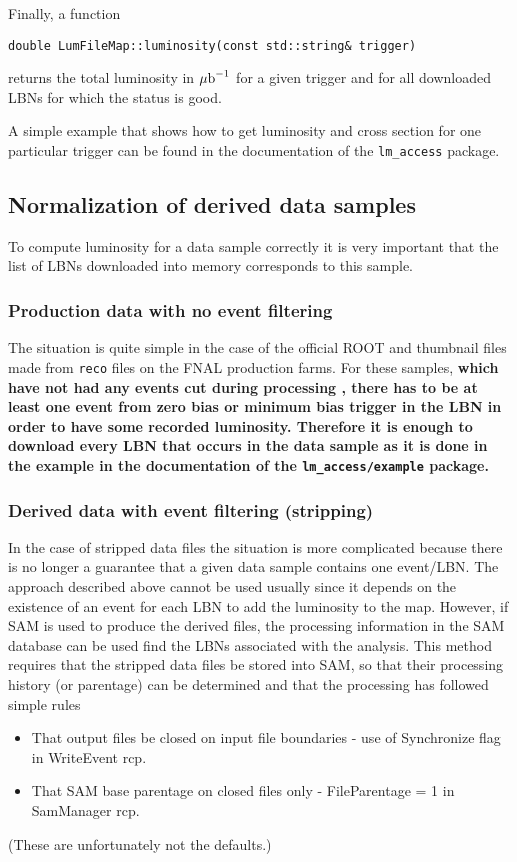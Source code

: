 \documentclass[12pt]{article}
\begin{document}
Finally, a function
\begin{flushleft}
\hspace*{4mm} {\tt double LumFileMap::luminosity(const std::string\& trigger)}
\end{flushleft}
returns the total luminosity in $\mu\hbox{b}^{-1}$ for a given trigger and for
all downloaded LBNs for which the status is good.

A simple example that shows how to get luminosity and cross section for one
particular trigger can be found in the documentation of the {\tt lm\_access}
package.

\subsection{Normalization of derived data samples}

To compute luminosity for a data sample correctly it is
very important that  the list of LBNs downloaded into  memory corresponds
to this sample.

\subsubsection{Production data with no event filtering}
The situation is quite simple in the case of the official ROOT and
thumbnail files
made from {\tt reco} files on the FNAL production farms.
For these samples, \bf which have not had any events cut during processing \rm, there has to be at least one event from zero bias
or minimum bias trigger in the LBN in order to have some recorded luminosity.
Therefore it is enough to download every LBN that occurs in the data sample
as it is done in the example in the documentation of the {\tt lm\_access/example}
package.

\subsubsection{Derived data with event filtering (stripping) }

In the case of stripped data files the situation is more complicated
because there is no longer a guarantee that a given data sample
contains one event/LBN.
The approach described above cannot be used usually since it depends
on the existence of an event for each LBN to add the luminosity to the map.
However, if  SAM is used to produce the derived files, the processing information in
the SAM database can be used find the LBNs associated with the analysis.
This method requires that the stripped data files be stored into SAM, so
that their processing history (or parentage) can be determined and that
the processing has followed simple rules
\begin{itemize}
\item  That output files be closed on
input file boundaries - use of Synchronize flag in WriteEvent rcp.
\item That SAM base parentage on closed files only - FileParentage = 1 in SamManager rcp.
\end{itemize}
(These are unfortunately not the defaults.)
\end{document}
